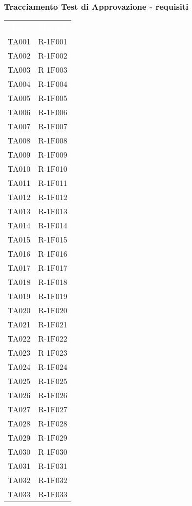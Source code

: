 \subsubsection{Tracciamento Test di Approvazione - requisiti}

\begin{tabularx}{\textwidth}{cX}
	
	\rowcolor{greySWEight}
	
	\rowcolor{greySWEight}
	\textcolor{white}{\textbf{Test}} & 
	\textcolor{white}{\textbf{Metodi}} \\
	
	TA001 & R-1F001 \\
	TA002 & R-1F002 \\
	TA003 & R-1F003 \\
	TA004 & R-1F004 \\
	TA005 & R-1F005 \\
	TA006 & R-1F006 \\
	TA007 & R-1F007 \\
	TA008 & R-1F008 \\
	TA009 & R-1F009 \\
	TA010 & R-1F010 \\
	TA011 & R-1F011 \\
	TA012 & R-1F012 \\
	TA013 & R-1F013 \\
	TA014 & R-1F014 \\
	TA015 & R-1F015 \\
	TA016 & R-1F016 \\
	TA017 & R-1F017 \\
	TA018 & R-1F018 \\
	TA019 & R-1F019 \\
	TA020 & R-1F020 \\
	TA021 & R-1F021 \\
	TA022 & R-1F022 \\
	TA023 & R-1F023 \\
	TA024 & R-1F024 \\
	TA025 & R-1F025 \\
	TA026 & R-1F026 \\
	TA027 & R-1F027 \\
	TA028 & R-1F028 \\
	TA029 & R-1F029 \\
	TA030 & R-1F030 \\
	TA031 & R-1F031 \\
	TA032 & R-1F032 \\
	TA033 & R-1F033 \\

\end{tabularx}
